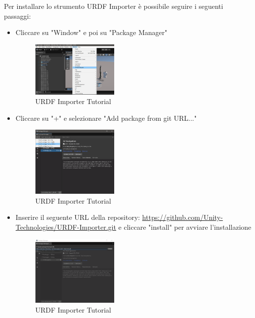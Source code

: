 \documentclass[11pt]{report}
\begin{document}
Per installare lo strumento URDF Importer è possibile seguire i seguenti passaggi:
\begin{itemize}
    \item Cliccare su "Window" e poi su "Package Manager"
    \begin{figure}[H]
        \centering
        \includegraphics[width=0.4\textwidth]{images/URDF_Importer_1.png}
        \caption{URDF Importer Tutorial}
        \label{fig:URDF_Importer_1}
    \end{figure}
    \item Cliccare su "+" e selezionare "Add package from git URL..."
    \begin{figure}[H]
        \centering
        \includegraphics[width=0.4\textwidth]{images/URDF_Importer_2.png}
        \caption{URDF Importer Tutorial}
        \label{fig:URDF_Importer_2}
    \end{figure}
    \item Inserire il seguente URL della repository: 
    \url{https://github.com/Unity-Technologies/URDF-Importer.git} e cliccare "install" per avviare l'installazione
    \begin{figure}[H]
        \centering
        \includegraphics[width=0.4\textwidth]{images/URDF_Importer_3.png}
        \caption{URDF Importer Tutorial}
        \label{fig:URDF_Importer_3}
    \end{figure}
\end{itemize}
\end{document}
